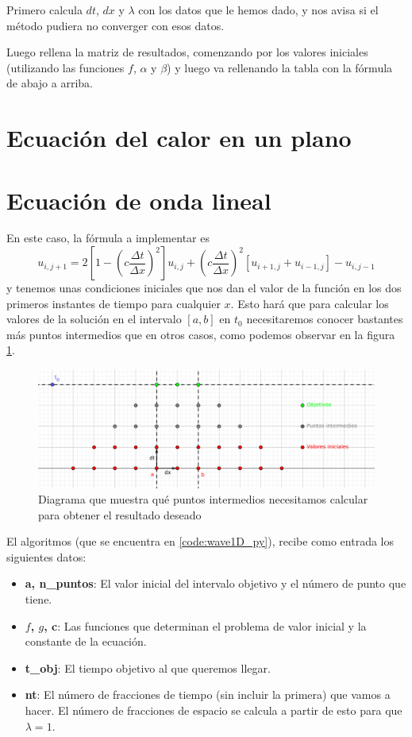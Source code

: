 Primero calcula $dt$, $dx$ y $\lambda$ con los datos que le hemos dado, y nos avisa si el método pudiera no converger con esos datos.

Luego rellena la matriz de resultados, comenzando por los valores iniciales (utilizando las funciones $f$, $\alpha$ y $\beta$) y luego va rellenando la tabla con la fórmula de abajo a arriba.


\section{Ecuación del calor en un plano}

\section{Ecuación de onda lineal}
En este caso, la fórmula a implementar es
\begin{equation*}
	u_{i,j+1} =  2\left[1 - \left(c\frac{\Delta t}{\Delta x}\right)^2\right]u_{i,j} + \left(c\frac{\Delta t}{\Delta x}\right)^2[u_{i+1,j} + u_{i-1,j}] - u_{i,j-1}
\end{equation*}
y tenemos unas condiciones iniciales que nos dan el valor de la función en los dos primeros instantes de tiempo para cualquier $x$. Esto hará que para calcular los valores de la solución en el intervalo  $[a,b]$ en $t_0$ necesitaremos conocer bastantes más puntos intermedios que en otros casos, como podemos observar en la figura \ref{fig:1dwavepoints}.

\begin{figure}
	\includegraphics[width=\linewidth]{Imagenes/Bitmap/1dwavepoints.png}
	\caption[Puntos ecuación del calor lineal]{Diagrama que muestra qué puntos intermedios necesitamos calcular para obtener el resultado deseado}
	\label{fig:1dwavepoints}
\end{figure}

El algoritmos (que se encuentra en \ref{code:wave1D_py}), recibe como entrada los siguientes datos:
\begin{itemize}[label=$\bullet$]
	\item \textbf{a, n\_puntos}: El valor inicial del intervalo objetivo y el número de punto que tiene.
	\item \textbf{$f$, $g$, c}: Las funciones que determinan el problema de valor inicial y la constante de la ecuación.
	\item \textbf{t\_obj}: El tiempo objetivo al que queremos llegar.
	\item \textbf{nt}: El número de fracciones de tiempo (sin incluir la primera) que vamos a hacer. El número de fracciones de espacio se calcula a partir de esto para que $\lambda=1$.
\end{itemize}

